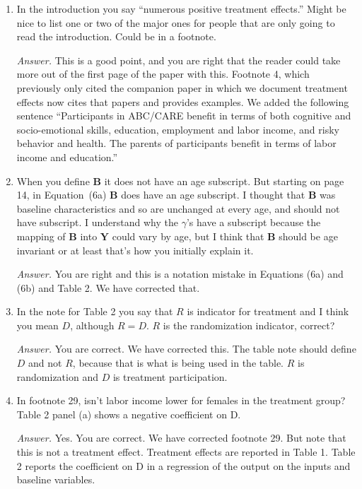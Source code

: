 \begin{enumerate}

\item In the introduction you say ``numerous positive treatment effects.'' Might be nice to list one or two of the major ones for people that are only going to read the introduction. Could be in a footnote. 

\noindent \textit{Answer.} This is a good point, and you are right that the reader could take more out of the first page of the paper with this. Footnote 4, which previously only cited the companion paper in which we document treatment effects now cites that papers and provides examples. We added the following sentence ``Participants in ABC/CARE benefit in terms of both cognitive and socio-emotional skills, education, employment and labor income, and risky behavior and health. The parents of participants benefit in terms of labor income and education.''

\item When you define $\bm{B}$ it does not have an age subscript. But starting on page 14, in Equation~(6a) $\bm{B}$ does have an age subscript. I thought that $\bm{B}$ was baseline characteristics and so are unchanged at every age, and should not have subscript. I understand why the $\gamma$'s have a subscript because the mapping of $\bm{B}$ into $\bm{Y}$ could vary by age, but I think that $\bm{B}$ should be age invariant or at least that's how you initially explain it. 

\noindent \textit{Answer.} You are right and this is a notation mistake in Equations (6a) and (6b) and Table 2. We have corrected that.

\item In the note for Table 2 you say that $R$ is indicator for treatment and I think you mean $D$, although $R=D$.  $R$ is the randomization indicator, correct?

\noindent \textit{Answer.} You are correct. We have corrected this. The table note should define $D$ and not $R$, because that is what is being used in the table. $R$ is randomization and $D$ is treatment participation.

\item In footnote 29, isn't labor income lower for females in the treatment group? Table 2 panel (a) shows a negative coefficient on D.

\noindent \textit{Answer.} Yes. You are correct. We have corrected footnote 29. But note that this is not a treatment effect. Treatment effects are reported in Table 1. Table 2 reports the coefficient on D in a regression of the output on the inputs and baseline variables.


\end{enumerate}

